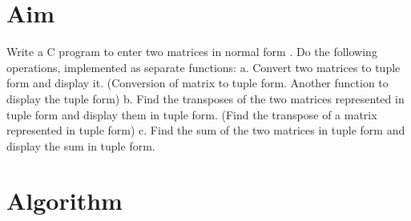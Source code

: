 
\section{Aim}
Write a C program to enter two matrices in normal form . Do the following operations,
implemented as separate functions:
a. Convert two matrices to tuple form and display it. (Conversion of matrix to tuple form.
Another function to display the tuple form)
b. Find the transposes of the two matrices represented in tuple form and display them in tuple
form. (Find the transpose of a matrix represented in tuple form)
c. Find the sum of the two matrices in tuple form and display the sum in tuple form.
\section{Algorithm}
